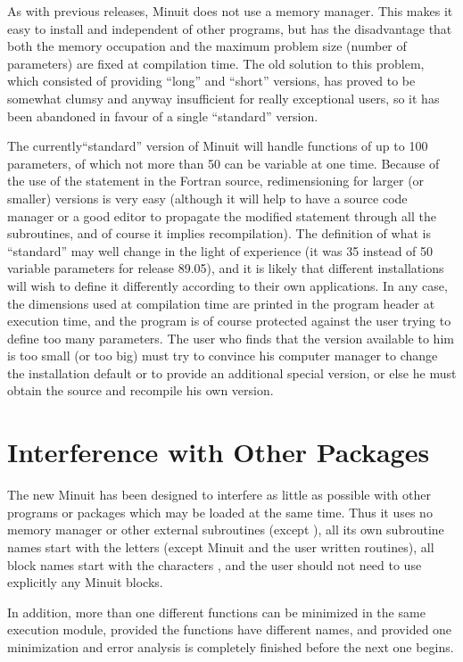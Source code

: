 As with previous releases, Minuit does not use a memory manager.
This makes it easy to install and independent of other programs,
but has the disadvantage that both the memory occupation and the
maximum problem size (number of parameters) are fixed at compilation
time.
The old solution to this problem, which consisted of providing
``long'' and ``short'' versions, has proved to be somewhat clumsy and
anyway insufficient for really exceptional users, so it has been
abandoned in favour of a single ``standard'' version.
 
The currently``standard'' version of Minuit
will handle functions of up to 100
parameters, of which not more than 50 can be variable at one time.
Because of the use of the  statement in the Fortran source,
redimensioning for larger (or smaller) versions is very easy
(although it will help to have a source code manager or a good editor
to propagate the modified  statement through all the
subroutines, and of course it implies recompilation).
The definition of what is ``standard'' may well change in the light of
experience (it was 35 instead of 50 variable parameters for
release 89.05),
and it is likely that different installations will wish
to define it differently according to their own applications.
In any case, the dimensions used at compilation time are printed
in the program header at execution time, and the program is of course
protected against the user trying to define too many parameters.
The user who finds that the version available to him is too small
(or too big) must try to convince his computer manager to change the
installation default or to provide an additional special version,
or else he must obtain the source and recompile his own version.
\section{Interference with Other Packages}
The new Minuit has been designed to interfere as little as possible
with other programs or packages which may be loaded at the same
time. Thus it uses no memory manager or other external subroutines
(except ), all its own subroutine names
start with the letters 
(except Minuit and the user written routines),
all  block names start with the characters ,
and the user should not need to use explicitly any
Minuit  blocks.
 
In addition, more than one different functions can be minimized in the
same execution module, provided the functions have different names,
and provided one minimization and error analysis is completely
finished before the next one begins.


